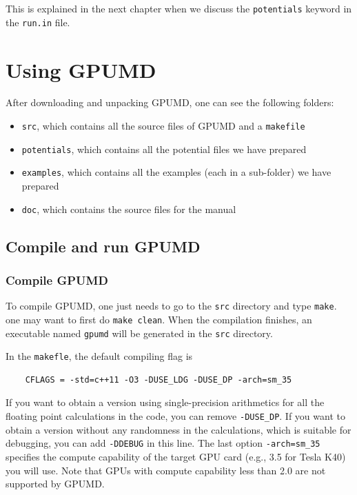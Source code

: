 \documentclass[12pt,a4paper]{report}
\begin{document}
This is explained in the next chapter when we discuss the \verb"potentials" keyword in the \verb"run.in" file.


\chapter{Using GPUMD \label{chapter:usage}}

After downloading and unpacking GPUMD, one can see the following folders:
\begin{itemize}
\item \verb"src", which contains all the source files of GPUMD and a \verb"makefile"
\item \verb"potentials", which contains all the potential files we have prepared
\item \verb"examples", which contains all the examples (each in a sub-folder) we have prepared
\item \verb"doc", which contains the source files for the manual
\end{itemize}


\section{Compile and run GPUMD}

\subsection{Compile GPUMD}

To compile GPUMD, one just needs to go to the \verb"src" directory and type \verb"make". one may want to first do \verb"make clean". When the compilation finishes, an executable named \verb"gpumd" will be generated in the \verb"src" directory.

In the \verb"makefle", the default compiling flag is
\begin{verbatim}
    CFLAGS = -std=c++11 -O3 -DUSE_LDG -DUSE_DP -arch=sm_35
\end{verbatim}
If you want to obtain a version using single-precision arithmetics for all the floating point calculations in the code, you can remove \verb"-DUSE_DP". If you want to obtain a version without any randomness in the calculations, which is suitable for debugging, you can add \verb"-DDEBUG" in this line. The last option \verb"-arch=sm_35" specifies the compute capability of the target GPU card (e.g., 3.5 for Tesla K40) you will use. Note that GPUs with compute capability less than 2.0 are not supported by GPUMD.
\end{document}
